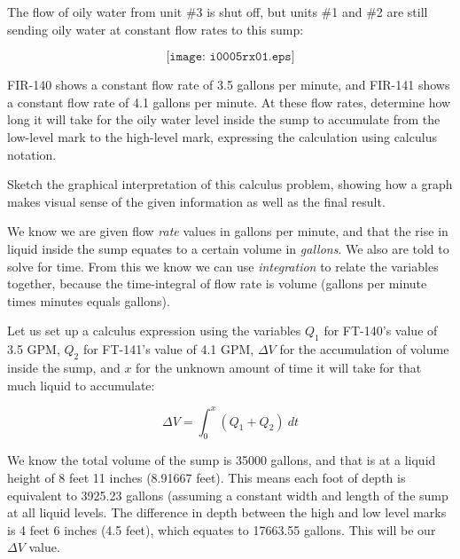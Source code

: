 

The flow of oily water from unit \#3 is shut off, but units \#1 and \#2 are still sending oily water at constant flow rates to this sump:

$$\texttt{[image: i0005rx01.eps]}$$

FIR-140 shows a constant flow rate of 3.5 gallons per minute, and FIR-141 shows a constant flow rate of 4.1 gallons per minute.  At these flow rates, determine how long it will take for the oily water level inside the sump to accumulate from the low-level mark to the high-level mark, expressing the calculation using calculus notation.

\vskip 10pt

Sketch the graphical interpretation of this calculus problem, showing how a graph makes visual sense of the given information as well as the final result.







We know we are given flow {\it rate} values in gallons per minute, and that the rise in liquid inside the sump equates to a certain volume in {\it gallons}.  We also are told to solve for time.  From this we know we can use {\it integration} to relate the variables together, because the time-integral of flow rate is volume (gallons per minute times minutes equals gallons).  

Let us set up a calculus expression using the variables $Q_1$ for FT-140's value of 3.5 GPM, $Q_2$ for FT-141's value of 4.1 GPM, $\Delta V$ for the accumulation of volume inside the sump, and $x$ for the unknown amount of time it will take for that much liquid to accumulate:

$$\Delta V = \int_0^{x} (Q_1 + Q_2) \> dt$$

We know the total volume of the sump is 35000 gallons, and that is at a liquid height of 8 feet 11 inches (8.91667 feet).  This means each foot of depth is equivalent to 3925.23 gallons (assuming a constant width and length of the sump at all liquid levels.  The difference in depth between the high and low level marks is 4 feet 6 inches (4.5 feet), which equates to 17663.55 gallons.  This will be our $\Delta V$ value.

